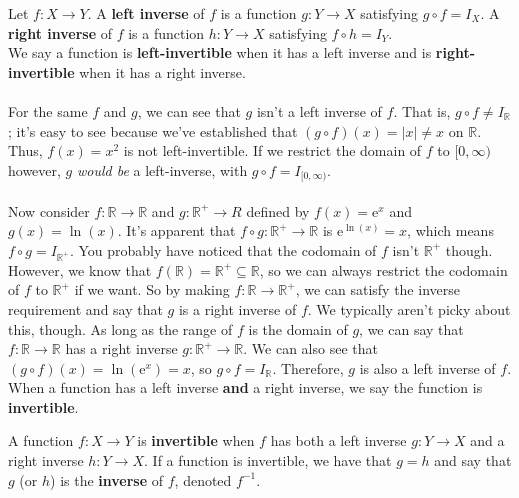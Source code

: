 \documentclass[12pt, a4paper, titlepage, twoside]{article}
\newcommand*{\R}{\mathbb{R}}
\newcommand*{\e}{\textrm{e}}
\begin{document}
	\begin{kp}
		Let $f : X \to Y$. A \textbf{left inverse} of $f$ is a function $g : Y \to X$ satisfying $g \circ f = I_X$. A \textbf{right inverse} of $f$ is
		a function $h : Y \to X$ satisfying $f \circ h = I_Y$.\\
		
		We say a function is \textbf{left-invertible} when it has a left inverse and is \textbf{right-invertible} when it has a right inverse.
	\end{kp} 
	
	\paragraph{}
	For the same $f$ and $g$, we can see that $g$ isn't a left inverse of $f$. That is, $g \circ f \neq I_{\R}$; it's easy to see because we've
	established that $(g \circ f)(x) = |x| \neq x$ on $\R$. Thus, $f(x) = x^2$ is not left-invertible. If we restrict the domain of $f$ to
	$[0,\infty)$ however, $g$ \textit{would be} a left-inverse, with $g \circ f = I_{[0,\infty)}$.
	
	\paragraph{}
	Now consider $f : \R \to \R$ and $g : \R^+ \to R$ defined by $f(x) = \e^x$ and $g(x) = \ln(x)$. It's apparent that $f \circ g : \R^+ \to \R$
	is $\e^{\ln(x)} = x$, which means $f \circ g = I_{\R^+}$. You probably have noticed that the codomain
	of $f$ isn't $\R^+$ though. However, we know that $f(\R) = \R^+ \subseteq \R$, so we can always restrict the codomain of $f$ to $\R^+$
	if we want. So by making $f : \R \to \R^+$, we can satisfy the inverse requirement and say that $g$ is a right inverse of $f$.
	We typically aren't picky about this, though. As long as the range of $f$ is the domain of $g$, we can say that $f : \R \to \R$
	has a right inverse $g : \R^+ \to \R$.
	We can also see that $(g \circ f)(x) = \ln(\e^x) = x$, so $g \circ f = I_{\R}$. Therefore, $g$ is also a left inverse of $f$. When a function
	has a left inverse \textbf{and} a right inverse, we say the function is \textbf{invertible}.\\
	
	\begin{kp}
		A function $f : X \to Y$ is \textbf{invertible} when $f$ has both a left inverse $g : Y \to X$ and a right inverse $h : Y \to X$.
		If a function is invertible, we have that $g = h$ and say that $g$ (or $h$) is the \textbf{inverse} of $f$, denoted $f^{-1}$.
	\end{kp}
	
\end{document}
